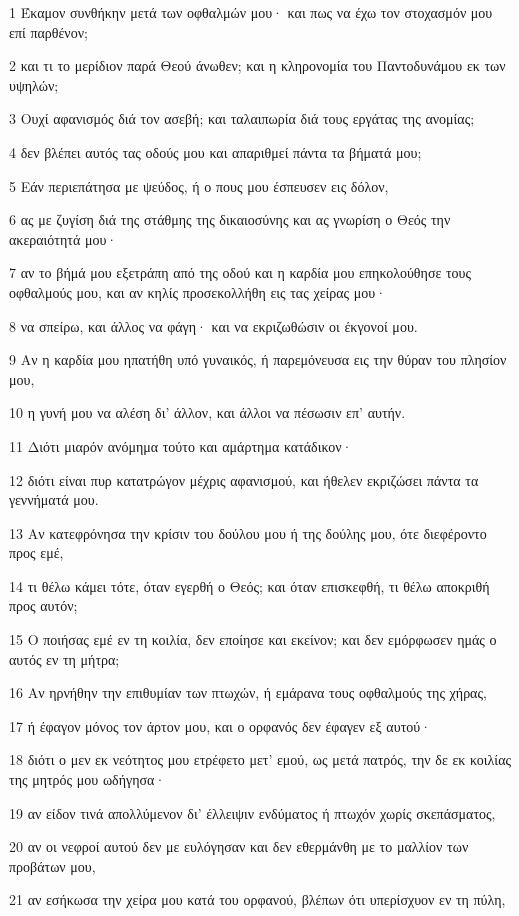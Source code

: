 \par 1 Έκαμον συνθήκην μετά των οφθαλμών μου· και πως να έχω τον στοχασμόν μου επί παρθένον;
\par 2 και τι το μερίδιον παρά Θεού άνωθεν; και η κληρονομία του Παντοδυνάμου εκ των υψηλών;
\par 3 Ουχί αφανισμός διά τον ασεβή; και ταλαιπωρία διά τους εργάτας της ανομίας;
\par 4 δεν βλέπει αυτός τας οδούς μου και απαριθμεί πάντα τα βήματά μου;
\par 5 Εάν περιεπάτησα με ψεύδος, ή ο πους μου έσπευσεν εις δόλον,
\par 6 ας με ζυγίση διά της στάθμης της δικαιοσύνης και ας γνωρίση ο Θεός την ακεραιότητά μου·
\par 7 αν το βήμά μου εξετράπη από της οδού και η καρδία μου επηκολούθησε τους οφθαλμούς μου, και αν κηλίς προσεκολλήθη εις τας χείρας μου·
\par 8 να σπείρω, και άλλος να φάγη· και να εκριζωθώσιν οι έκγονοί μου.
\par 9 Αν η καρδία μου ηπατήθη υπό γυναικός, ή παρεμόνευσα εις την θύραν του πλησίον μου,
\par 10 η γυνή μου να αλέση δι' άλλον, και άλλοι να πέσωσιν επ' αυτήν.
\par 11 Διότι μιαρόν ανόμημα τούτο και αμάρτημα κατάδικον·
\par 12 διότι είναι πυρ κατατρώγον μέχρις αφανισμού, και ήθελεν εκριζώσει πάντα τα γεννήματά μου.
\par 13 Αν κατεφρόνησα την κρίσιν του δούλου μου ή της δούλης μου, ότε διεφέροντο προς εμέ,
\par 14 τι θέλω κάμει τότε, όταν εγερθή ο Θεός; και όταν επισκεφθή, τι θέλω αποκριθή προς αυτόν;
\par 15 Ο ποιήσας εμέ εν τη κοιλία, δεν εποίησε και εκείνον; και δεν εμόρφωσεν ημάς ο αυτός εν τη μήτρα;
\par 16 Αν ηρνήθην την επιθυμίαν των πτωχών, ή εμάρανα τους οφθαλμούς της χήρας,
\par 17 ή έφαγον μόνος τον άρτον μου, και ο ορφανός δεν έφαγεν εξ αυτού·
\par 18 διότι ο μεν εκ νεότητος μου ετρέφετο μετ' εμού, ως μετά πατρός, την δε εκ κοιλίας της μητρός μου ωδήγησα·
\par 19 αν είδον τινά απολλύμενον δι' έλλειψιν ενδύματος ή πτωχόν χωρίς σκεπάσματος,
\par 20 αν οι νεφροί αυτού δεν με ευλόγησαν και δεν εθερμάνθη με το μαλλίον των προβάτων μου,
\par 21 αν εσήκωσα την χείρα μου κατά του ορφανού, βλέπων ότι υπερίσχυον εν τη πύλη,
